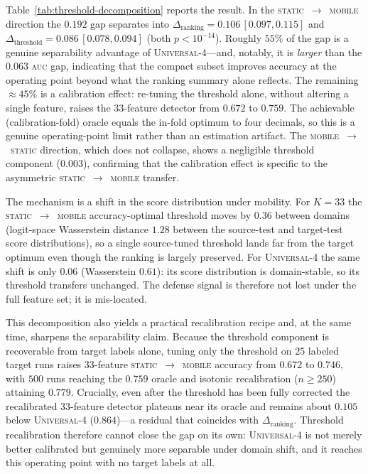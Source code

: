 Table~\ref{tab:threshold-decomposition} reports the result. In the
\textsc{static}~$\rightarrow$~\textsc{mobile} direction the $0.192$ gap separates
into $\Delta_{\text{ranking}}=0.106\,[0.097,0.115]$ and
$\Delta_{\text{threshold}}=0.086\,[0.078,0.094]$ (both $p<10^{-14}$). Roughly
$55\%$ of the gap is a genuine separability advantage of \textsc{Universal-4}---and,
notably, it is \emph{larger} than the $0.063$ \textsc{auc} gap, indicating that the
compact subset improves accuracy at the operating point beyond what the ranking
summary alone reflects. The remaining $\approx 45\%$ is a calibration effect:
re-tuning the threshold alone, without altering a single feature, raises the
$33$-feature detector from $0.672$ to $0.759$. The achievable (calibration-fold)
oracle equals the in-fold optimum to four decimals, so this is a genuine
operating-point limit rather than an estimation artifact. The
\textsc{mobile}~$\rightarrow$~\textsc{static} direction, which does not collapse,
shows a negligible threshold component ($0.003$), confirming that the calibration
effect is specific to the asymmetric \textsc{static}~$\rightarrow$~\textsc{mobile}
transfer.

The mechanism is a shift in the score distribution under mobility. For $K=33$ the
\textsc{static}~$\rightarrow$~\textsc{mobile} accuracy-optimal threshold moves by
$0.36$ between domains (logit-space Wasserstein distance $1.28$ between the
source-test and target-test score distributions), so a single source-tuned
threshold lands far from the target optimum even though the ranking is largely
preserved. For \textsc{Universal-4} the same shift is only $0.06$ (Wasserstein
$0.61$): its score distribution is domain-stable, so its threshold transfers
unchanged. The defense signal is therefore not lost under the full feature set;
it is mis-located.

This decomposition also yields a practical recalibration recipe and, at the same
time, sharpens the separability claim. Because the threshold component is
recoverable from target labels alone, tuning only the threshold on $25$ labeled
target runs raises $33$-feature \textsc{static}~$\rightarrow$~\textsc{mobile}
accuracy from $0.672$ to $0.746$, with $500$ runs reaching the $0.759$ oracle and
isotonic recalibration ($n\geq250$) attaining $0.779$. Crucially, even after the
threshold has been fully corrected the recalibrated $33$-feature detector plateaus
near its oracle and remains about $0.105$ below \textsc{Universal-4} ($0.864$)---a
residual that coincides with $\Delta_{\text{ranking}}$. Threshold recalibration
therefore cannot close the gap on its own: \textsc{Universal-4} is not merely
better calibrated but genuinely more separable under domain shift, and it reaches
this operating point with no target labels at all.

